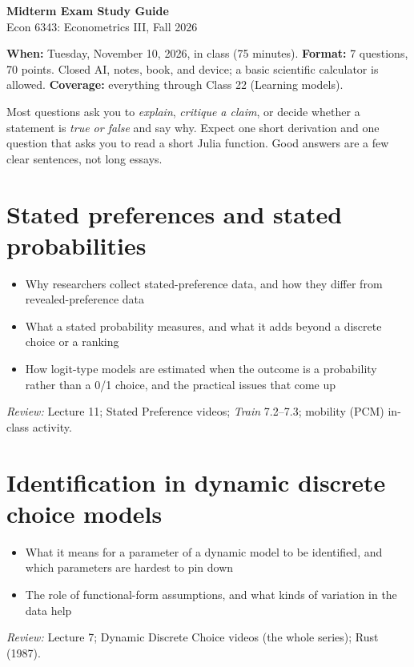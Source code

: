 \documentclass[11pt]{article}
\newcommand{\review}[1]{\par\smallskip\textit{Review:} #1}
\begin{document}
{\LARGE\bfseries Midterm Exam Study Guide}\\[0.3ex]
{\large Econ 6343: Econometrics III, Fall 2026}

\smallskip
{}

\medskip
\textbf{When:} Tuesday, November 10, 2026, in class (75 minutes).\quad
\textbf{Format:} 7 questions, 70 points. Closed AI, notes, book, and device; a basic scientific calculator is allowed.\quad
\textbf{Coverage:} everything through Class 22 (Learning models).

Most questions ask you to \emph{explain}, \emph{critique a claim}, or decide whether a statement is \emph{true or false} and say why. Expect one short derivation and one question that asks you to read a short Julia function. Good answers are a few clear sentences, not long essays.

\section{Stated preferences and stated probabilities}
\begin{itemize}
\item Why researchers collect stated-preference data, and how they differ from revealed-preference data
\item What a stated probability measures, and what it adds beyond a discrete choice or a ranking
\item How logit-type models are estimated when the outcome is a probability rather than a 0/1 choice, and the practical issues that come up
\end{itemize}
\review{Lecture 11; Stated Preference videos; \emph{Train} 7.2--7.3; mobility (PCM) in-class activity.}

\section{Identification in dynamic discrete choice models}
\begin{itemize}
\item What it means for a parameter of a dynamic model to be identified, and which parameters are hardest to pin down
\item The role of functional-form assumptions, and what kinds of variation in the data help
\end{itemize}
\review{Lecture 7; Dynamic Discrete Choice videos (the whole series); Rust (1987).}
\end{document}
